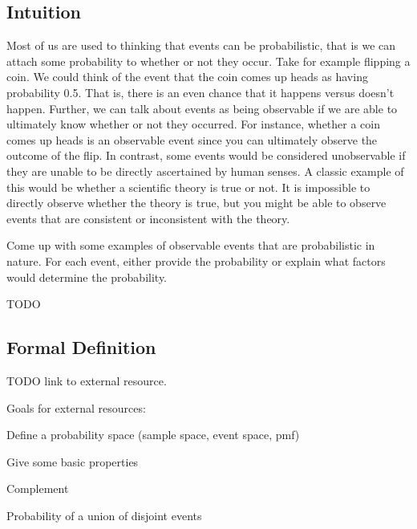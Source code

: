 \documentclass[assignment01_Solutions]{subfiles}
\begin{document}
\subsection{Intuition}
Most of us are used to thinking that events can be probabilistic, that is we can attach some probability to whether or not they occur.  Take for example flipping a coin.  We could think of the event that the coin comes up heads as having probability 0.5.  That is, there is an even chance that it happens versus doesn’t happen.  Further, we can talk about events as being observable if we are able to ultimately know whether or not they occurred.  For instance, whether a coin comes up heads is an observable event since you can ultimately observe the outcome of the flip.  In contrast, some events would be considered unobservable if they are unable to be directly ascertained by human senses.  A classic example of this would be whether a scientific theory is true or not.  It is impossible to directly observe whether the theory is true, but you might be able to observe events that are consistent or inconsistent with the theory.

\vspace{1em}
\begin{exercise}
Come up with some examples of observable events that are probabilistic in nature.  For each event, either provide the probability or explain what factors would determine the probability.

\begin{boxedsolution}
TODO
\end{boxedsolution}

\end{exercise}

\subsection{Formal Definition}

TODO link to external resource.
\begin{externalresources}
\bi
\item Goals for external resources:
\item Define a probability space (sample space, event space, pmf)
\item Give some basic properties
\item Complement
\item Probability of a union of disjoint events
\ei

\end{externalresources}
\end{document}
